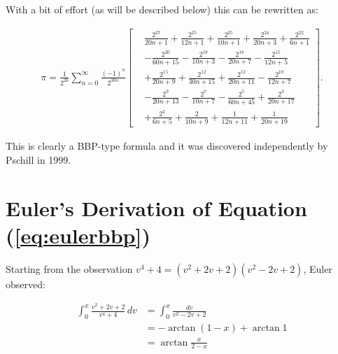 \documentclass[11pt]{article}
\begin{document}
With a bit of effort (as will be described below) this can be rewritten as:

\begin{equation}  \label{eq:eulerbbp2}
\begin{split}
  \pi
  = \frac{1}{2^{26}} \sum_{n = 0}^\infty \frac{(-1)^n}{2^{30n}} \left[
    \begin{aligned}
    & \frac{2^{27}}{20n+1}
    + \frac{2^{25}}{12n+1}
    + \frac{2^{25}}{10n+1}
    + \frac{2^{24}}{20n+3}
    + \frac{2^{22}}{6n+1} \\
    &- \frac{2^{20}}{60n+15}
    - \frac{2^{19}}{10n+3}
    - \frac{2^{18}}{20n+7}
    - \frac{2^{15}}{12n+5} \\
    &+ \frac{2^{15}}{20n+9}
    + \frac{2^{12}}{30n+15}
    + \frac{2^{12}}{20n+11}
    - \frac{2^{10}}{12n+7} \\
    &- \frac{2^{9}}{20n+13} 
    - \frac{2^{7}}{10n+7}
    - \frac{2^{5}}{60n+45}
    + \frac{2^{3}}{20n+17} \\
    &+ \frac{2^{2}}{6n+5}
    + \frac{2}{10n+9}
    + \frac{1}{12n+11}
    + \frac{1}{20n+19}
    \end{aligned}
  \right].
\end{split}
\end{equation}

This is clearly a BBP-type formula and it was discovered independently by Pschill \cite{Arndt2001} in 1999.

\section{Euler's Derivation of Equation (\ref{eq:eulerbbp})}

Starting from the observation $v^4 + 4 = (v^2 + 2v + 2)(v^2 - 2v + 2)$, Euler observed:

\begin{align}
\int_0^x \frac{v^2 + 2v + 2}{v^4 + 4} \,dv \label{eq:integral}
&= \int_0^x \frac{dv}{v^2 - 2v + 2} \\
&= -\arctan{(1-x)} + \arctan{1} \\
&= \arctan{\frac{x}{2-x}} \label{eq:rhs}
\end{align}


\end{document}
